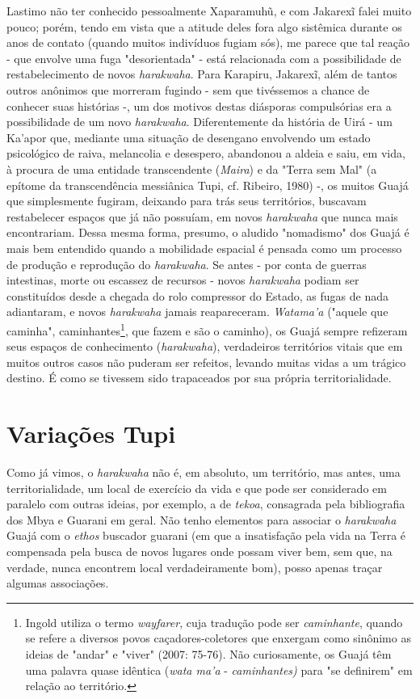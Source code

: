Lastimo não ter conhecido pessoalmente Xaparamuhũ, e com Jakarexĩ falei
muito pouco; porém, tendo em vista que a atitude deles fora algo
sistêmica durante os anos de contato (quando muitos indivíduos fugiam
sós), me parece que tal reação - que envolve uma fuga "desorientada" -
está relacionada com a possibilidade de restabelecimento de novos
\emph{harakwaha}. Para Karapiru, Jakarexĩ, além de tantos outros
anônimos que morreram fugindo - sem que tivéssemos a chance de conhecer
suas histórias -, um dos motivos destas diásporas compulsórias era a
possibilidade de um novo \emph{harakwaha}. Diferentemente da história de
Uirá - um Ka'apor que, mediante uma situação de desengano envolvendo um
estado psicológico de raiva, melancolia e desespero, abandonou a aldeia
e saiu, em vida, à procura de uma entidade transcendente (\emph{Maira})
e da "Terra sem Mal" (a epítome da transcendência messiânica Tupi, cf.
Ribeiro, 1980) -, os muitos Guajá que simplesmente fugiram, deixando
para trás seus territórios, buscavam restabelecer espaços que já não
possuíam, em novos \emph{harakwaha} que nunca mais encontrariam. Dessa
mesma forma, presumo, o aludido "nomadismo" dos Guajá é mais bem
entendido quando a mobilidade espacial é pensada como um processo de
produção e reprodução do \emph{harakwaha}. Se antes - por conta de
guerras intestinas, morte ou escassez de recursos - novos
\emph{harakwaha} podiam ser constituídos desde a chegada do rolo
compressor do Estado, as fugas de nada adiantaram, e novos
\emph{harakwaha} jamais reapareceram. \emph{Watama'a} ("aquele que
caminha", caminhantes\footnote{Ingold utiliza o termo \emph{wayfarer},
  cuja tradução pode ser \emph{caminhante}, quando se refere a diversos
  povos caçadores-coletores que enxergam como sinônimo as ideias de
  "andar" e "viver" (2007: 75-76). Não curiosamente, os Guajá têm uma
  palavra quase idêntica (\emph{wata ma'a} - \emph{caminhantes)} para
  "se definirem" em relação ao território.}, que fazem e são o caminho),
os Guajá sempre refizeram seus espaços de conhecimento
(\emph{harakwaha}), verdadeiros territórios vitais que em muitos outros
casos não puderam ser refeitos, levando muitas vidas a um trágico
destino. É como se tivessem sido trapaceados por sua própria
territorialidade.

\section{Variações Tupi}\label{variauxe7uxf5es-tupi}

Como já vimos, o \emph{harakwaha} não é, em absoluto, um território{,}
mas antes, uma territorialidade, um local de exercício da vida e que
pode ser considerado em paralelo com outras ideias, por exemplo, a de
\emph{tekoa}, consagrada pela bibliografia dos Mbya e Guarani em geral.
Não tenho elementos para associar o \emph{harakwaha} Guajá com o
\emph{ethos} buscador guarani (em que a insatisfação pela vida na Terra
é compensada pela busca de novos lugares onde possam viver bem, sem que,
na verdade, nunca encontrem local verdadeiramente bom), posso apenas
traçar algumas associações.

